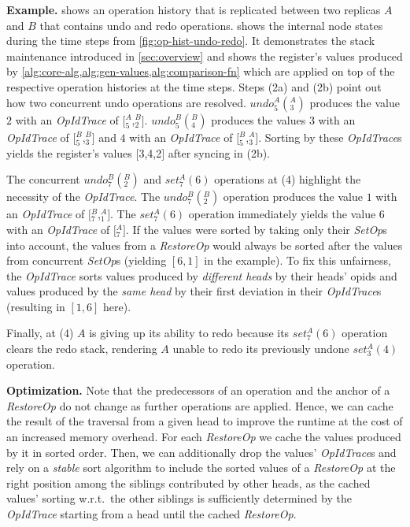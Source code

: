 \documentclass[sigplan,10pt]{acmart}
\newcommand{\opid}[2]{$\mathit{_{#1}^{#2}}$}
\newcommand{\setop}[4][set]{$\mathit{#1_{#2}^{#3}(#4)}$}
\newcommand{\undop}[5][undo]{$\mathit{#1_{#2}^{#3}(_{#4}^{#5})}$}
\newcommand{\stack}[1]{$[$#1$]$}
\newcommand{\setopkind}{\textit{SetOp}}
\newcommand{\restopkind}{\textit{RestoreOp}}
\newcommand{\opidtrace}{\textit{OpIdTrace}}
\begin{document}
\textbf{Example.}\label{sec:algo-example}
 shows an operation history that is replicated
between two replicas $A$ and $B$ that contains undo and redo operations.
 shows the internal node states during the time steps
from \cref{fig:op-hist-undo-redo}.
It demonstrates the stack maintenance introduced in \cref{sec:overview} and
shows the register's values produced by
\cref{alg:core-alg,alg:gen-values,alg:comparison-fn} which are applied on top
of the respective operation histories at the time steps.
Steps (2a) and (2b) point out how two concurrent undo operations are resolved.
\undop{5}{A}{3}{A} produces the value $2$ with an \opidtrace{} of
\stack{\opid{5}{A},\opid{2}{B}}.
\undop{5}{B}{4}{B} produces the values $3$ with an \opidtrace{} of
\stack{\opid{5}{B},\opid{3}{B}}
and $4$ with an \opidtrace{} of
\stack{\opid{5}{B},\opid{3}{A}}.
Sorting by these \opidtrace{}s yields the register's values \stack{3,4,2}
after syncing in (2b).

The concurrent \undop{7}{B}{2}{B} and \setop{7}{A}{6} operations at (4) highlight
the necessity of the \opidtrace{}.
The \undop{7}{B}{2}{B} operation produces the value $1$ with an \opidtrace{} of
\stack{\opid{7}{B},\opid{1}{A}}.
The \setop{7}{A}{6} operation immediately yields the value $6$ with an
\opidtrace{} of \stack{\opid{7}{A}}.
If the values were sorted by taking only their \setopkind{}s into account,
the values from a \restopkind{} would always be sorted after
the values from concurrent \setopkind{}s (yielding $[6, 1]$ in the example).
To fix this unfairness, the \opidtrace{} sorts values produced by
\emph{different heads} by their heads' \glspl*{opid}
and values produced by the \emph{same head}
by their first deviation in their \opidtrace{}s (resulting in $[1, 6]$ here).

Finally, at (4) $A$ is giving up its ability to redo because its
\setop{7}{A}{6} operation clears the redo stack,
rendering $A$ unable to redo its previously undone \setop{3}{A}{4} operation.

\textbf{Optimization.}\label{sec:opt}
Note that the predecessors of an operation and the
anchor of a \restopkind{} do not change as further operations are applied.
Hence, we can cache the result of the traversal from a given head
to improve the runtime at the cost of an increased memory overhead.
For each \restopkind{} we cache the values produced by it in sorted order.
Then, we can additionally drop the values'
\opidtrace{}s and rely on a \emph{stable} sort algorithm to include the sorted
values of a \restopkind{} at the right position among the siblings contributed
by other heads, as the cached values' sorting w.r.t.\ the other siblings
is sufficiently determined by the \opidtrace{} starting from a head until the
cached \restopkind{}.
\end{document}
